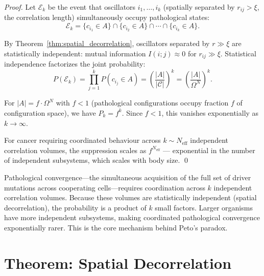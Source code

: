 \begin{proof}
Let $\mathcal{E}_k$ be the event that oscillators $i_1, \ldots, i_k$ (spatially
separated by $r_{ij} > \xi$, the correlation length) simultaneously occupy
pathological states:
\begin{equation}
  \mathcal{E}_k = \{c_{i_1} \in A\} \cap \{c_{i_2} \in A\} \cap \cdots \cap \{c_{i_k} \in A\}.
\end{equation}

By Theorem~\ref{thm:spatial_decorrelation}, oscillators separated by $r \gg \xi$
are statistically independent: mutual information $I(i;j) \approx 0$ for
$r_{ij} \gg \xi$. Statistical independence factorizes the joint probability:
\begin{equation}
  P(\mathcal{E}_k) = \prod_{j=1}^k P(c_{i_j} \in A) = \left(\frac{|A|}{|\mathcal{C}|}\right)^k
  = \left(\frac{|A|}{\Omega^N}\right)^k.
\end{equation}

For $|A| = f \cdot \Omega^N$ with $f < 1$ (pathological configurations occupy
fraction $f$ of configuration space), we have $P_k = f^k$. Since $f < 1$,
this vanishes exponentially as $k \to \infty$.

For cancer requiring coordinated behaviour across $k \sim N_{\mathrm{eff}}$
independent correlation volumes, the suppression scales as $f^{N_{\mathrm{eff}}}$
--- exponential in the number of independent subsystems, which scales with body
size. \qed
\end{proof}

\begin{remark}
Pathological convergence---the simultaneous acquisition of the full set of driver
mutations across cooperating cells---requires coordination across $k$ independent
correlation volumes. Because these volumes are statistically independent (spatial
decorrelation), the probability is a product of $k$ small factors. Larger organisms
have more independent subsystems, making coordinated pathological convergence
exponentially rarer. This is the core mechanism behind Peto's paradox.
\end{remark}

\section{Theorem: Spatial Decorrelation}
\label{sec:spatial_decorrelation}


